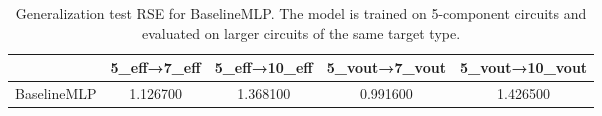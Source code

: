 \begin{table}
\caption{Generalization test RSE for BaselineMLP. The model is trained on 5-component circuits and evaluated on larger circuits of the same target type.}
\label{tab:generalization_baseline_mlp}
\begin{tabular}{lcccc}
\toprule
 & 5_eff→7_eff & 5_eff→10_eff & 5_vout→7_vout & 5_vout→10_vout \\
\midrule
BaselineMLP & 1.126700 & 1.368100 & 0.991600 & 1.426500 \\
\bottomrule
\end{tabular}
\end{table}
